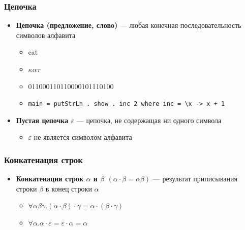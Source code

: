 \documentclass{beamer}
\begin{document}
\begin{frame}[fragile]
  \transwipe[direction=90]
  \frametitle{Цепочка}
  \begin{itemize}
    \item \textbf{Цепочка (предложение, слово)} --- любая конечная 
последовательность символов алфавита
    \begin{itemize}
      \item cat
      \item $\kappa \alpha \tau$
      \item 011000110110000101110100
      \item \verb!main = putStrLn . show . inc 2 where inc = \x -> x + 1!
    \end{itemize}    
    \item \textbf{Пустая цепочка $\varepsilon$} --- цепочка, не содержащая ни одного символа
    \begin{itemize}
      \item $\varepsilon$ не является символом алфавита
    \end{itemize}   
  \end{itemize}
\end{frame}

\begin{frame}[fragile]
  \transwipe[direction=90]
  \frametitle{Конкатенация строк}
  \begin{itemize}
    \item \textbf{Конкатенация строк $\alpha$ и $\beta$ $(\alpha \cdot \beta = \alpha \beta)$} --- результат 
приписывания строки $\beta$ в конец строки $\alpha$
    \begin{itemize}
      \item $\forall \alpha \beta \gamma. (\alpha \cdot \beta) \cdot \gamma = \alpha \cdot (\beta \cdot \gamma)$
      \item $\forall \alpha. \alpha \cdot \varepsilon = \varepsilon \cdot \alpha = \alpha$
    \end{itemize}
  \end{itemize}
\end{frame}
\end{document}
